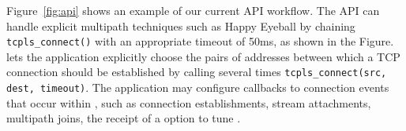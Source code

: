 Figure~\ref{fig:api} shows an example of our current API workflow. The API can
handle explicit multipath techniques such as Happy Eyeball by chaining
\texttt{tcpls\_connect()} with an appropriate timeout of 50ms, as shown in the
Figure. \tcpls lets the application explicitly choose the pairs of addresses 
between which a TCP connection should be established by
calling several times \texttt{tcpls\_connect(src, dest, timeout)}. The
application may configure callbacks to connection events that occur within
\tcpls, such as connection establishments, stream attachments, multipath
joins, the receipt of a \tcp option to tune \tcp. 







